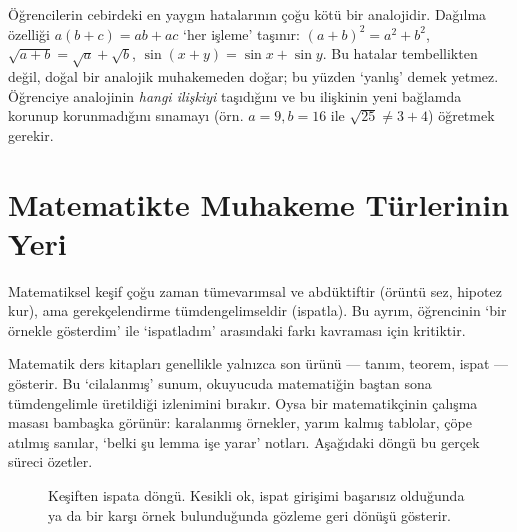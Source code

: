 \begin{yanilgi}
Öğrencilerin cebirdeki en yaygın hatalarının çoğu kötü bir analojidir. Dağılma özelliği $a(b+c)=ab+ac$ ‘her işleme’ taşınır: $(a+b)^2=a^2+b^2$, $\sqrt{a+b}=\sqrt a+\sqrt b$, $\sin(x+y)=\sin x+\sin y$. Bu hatalar tembellikten değil, doğal bir analojik muhakemeden doğar; bu yüzden ‘yanlış’ demek yetmez. Öğrenciye analojinin \emph{hangi ilişkiyi} taşıdığını ve bu ilişkinin yeni bağlamda korunup korunmadığını sınamayı (örn. $a=9,b=16$ ile $\sqrt{25}\neq3+4$) öğretmek gerekir.
\end{yanilgi}

\section{Matematikte Muhakeme Türlerinin Yeri}

Matematiksel keşif çoğu zaman tümevarımsal ve abdüktiftir (örüntü sez, hipotez kur), ama gerekçelendirme tümdengelimseldir (ispatla). Bu ayrım, öğrencinin ‘bir örnekle gösterdim’ ile ‘ispatladım’ arasındaki farkı kavraması için kritiktir.

Matematik ders kitapları genellikle yalnızca son ürünü — tanım, teorem, ispat — gösterir. Bu ‘cilalanmış’ sunum, okuyucuda matematiğin baştan sona tümdengelimle üretildiği izlenimini bırakır. Oysa bir matematikçinin çalışma masası bambaşka görünür: karalanmış örnekler, yarım kalmış tablolar, çöpe atılmış sanılar, ‘belki şu lemma işe yarar’ notları. Aşağıdaki döngü bu gerçek süreci özetler.

\begin{figure}[h]
\centering
{}
\caption{Keşiften ispata döngü. Kesikli ok, ispat girişimi başarısız olduğunda ya da bir karşı örnek bulunduğunda gözleme geri dönüşü gösterir.}
\end{figure}

